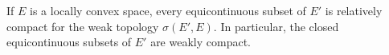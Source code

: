 If \(E\) is a locally convex space, every equicontinuous subset of \(E'\) is relatively compact for the weak topology \(\sigma(E', E)\). In particular, the closed equicontinuous subsets of \(E'\) are weakly compact.